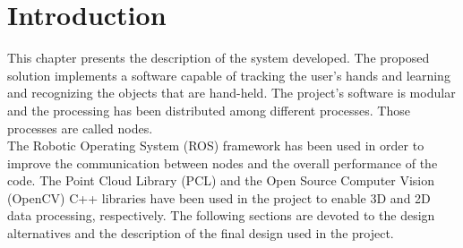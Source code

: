 \section{Introduction}

This chapter presents the description of the system developed.
The proposed solution implements a software capable of tracking the user's hands and learning and recognizing the objects that are hand-held. 
The project's software is modular and the processing has been distributed among different processes.
Those processes are called nodes.  
\\

The Robotic Operating System (ROS) framework has been used in order to improve the communication between nodes and the overall performance of the code. The Point Cloud Library (PCL) and 
the Open Source Computer Vision (OpenCV) C++ libraries have been used in the project to enable 3D and 2D data processing, respectively. 
The following sections are devoted to the design alternatives and the description of the final design used in the project. 